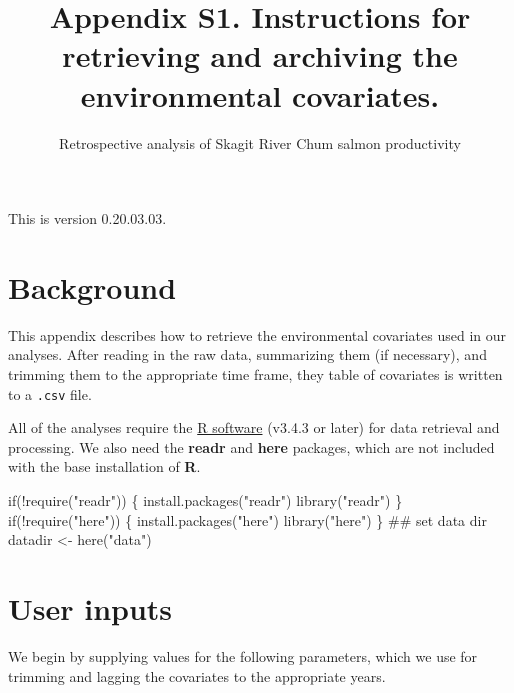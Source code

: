 \documentclass[11pt,]{article}
\title{Appendix S1. Instructions for retrieving and archiving the environmental
covariates.}
\subtitle{Retrospective analysis of Skagit River Chum salmon productivity}
\author{}
\date{}
\newenvironment{Shaded}{}{}
\newcommand{\KeywordTok}[1]{\textcolor[rgb]{0.00,0.00,1.00}{#1}}
\newcommand{\StringTok}[1]{\textcolor[rgb]{0.00,0.50,0.50}{#1}}
\newcommand{\ControlFlowTok}[1]{\textcolor[rgb]{0.00,0.00,1.00}{#1}}
\newcommand{\OperatorTok}[1]{#1}
\newcommand{\NormalTok}[1]{#1}
\begin{document}
\maketitle

{
\setcounter{tocdepth}{2}
\tableofcontents
}
\vspace{0.2in}

This is version 0.20.03.03.

\section{Background}\label{background}

This appendix describes how to retrieve the environmental covariates
used in our analyses. After reading in the raw data, summarizing them
(if necessary), and trimming them to the appropriate time frame, they
table of covariates is written to a \texttt{.csv} file.

All of the analyses require the \href{https://cran.r-project.org/}{R
software} (v3.4.3 or later) for data retrieval and processing. We also
need the \textbf{readr} and \textbf{here} packages, which are not
included with the base installation of \textbf{R}.

\begin{Shaded}
\begin{Highlighting}[]
\ControlFlowTok{if}\NormalTok{(}\OperatorTok{!}\KeywordTok{require}\NormalTok{(}\StringTok{"readr"}\NormalTok{)) \{}
  \KeywordTok{install.packages}\NormalTok{(}\StringTok{"readr"}\NormalTok{)}
  \KeywordTok{library}\NormalTok{(}\StringTok{"readr"}\NormalTok{)}
\NormalTok{\}}
\ControlFlowTok{if}\NormalTok{(}\OperatorTok{!}\KeywordTok{require}\NormalTok{(}\StringTok{"here"}\NormalTok{)) \{}
  \KeywordTok{install.packages}\NormalTok{(}\StringTok{"here"}\NormalTok{)}
  \KeywordTok{library}\NormalTok{(}\StringTok{"here"}\NormalTok{)}
\NormalTok{\}}
\NormalTok{## set data dir}
\NormalTok{datadir <-}\StringTok{ }\KeywordTok{here}\NormalTok{(}\StringTok{"data"}\NormalTok{)}
\end{Highlighting}
\end{Shaded}

\section{User inputs}\label{user-inputs}

We begin by supplying values for the following parameters, which we use
for trimming and lagging the covariates to the appropriate years.
\end{document}
